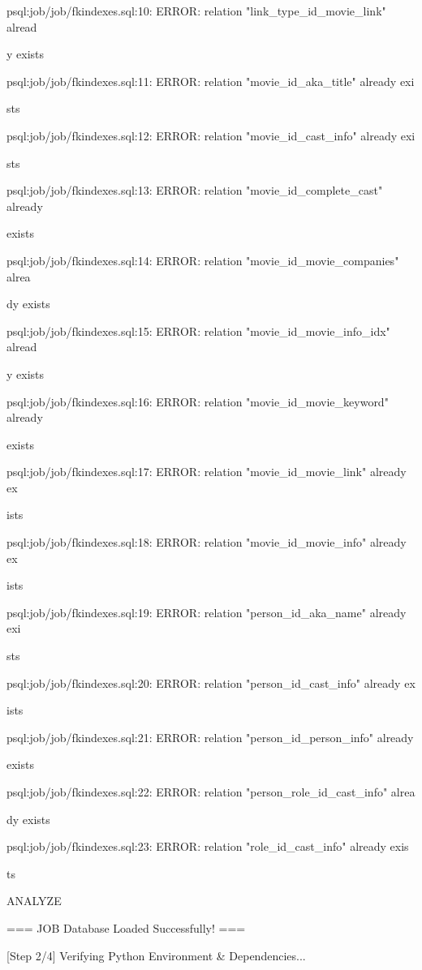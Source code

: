\documentclass[11pt,a4paper]{article}
\begin{document}
psql:job/job/fkindexes.sql:10: ERROR:  relation "link\_type\_id\_movie\_link" alread

y exists

psql:job/job/fkindexes.sql:11: ERROR:  relation "movie\_id\_aka\_title" already exi

sts

psql:job/job/fkindexes.sql:12: ERROR:  relation "movie\_id\_cast\_info" already exi

sts

psql:job/job/fkindexes.sql:13: ERROR:  relation "movie\_id\_complete\_cast" already

exists

psql:job/job/fkindexes.sql:14: ERROR:  relation "movie\_id\_movie\_companies" alrea

dy exists

psql:job/job/fkindexes.sql:15: ERROR:  relation "movie\_id\_movie\_info\_idx" alread

y exists

psql:job/job/fkindexes.sql:16: ERROR:  relation "movie\_id\_movie\_keyword" already

exists

psql:job/job/fkindexes.sql:17: ERROR:  relation "movie\_id\_movie\_link" already ex

ists

psql:job/job/fkindexes.sql:18: ERROR:  relation "movie\_id\_movie\_info" already ex

ists

psql:job/job/fkindexes.sql:19: ERROR:  relation "person\_id\_aka\_name" already exi

sts

psql:job/job/fkindexes.sql:20: ERROR:  relation "person\_id\_cast\_info" already ex

ists

psql:job/job/fkindexes.sql:21: ERROR:  relation "person\_id\_person\_info" already

exists

psql:job/job/fkindexes.sql:22: ERROR:  relation "person\_role\_id\_cast\_info" alrea

dy exists

psql:job/job/fkindexes.sql:23: ERROR:  relation "role\_id\_cast\_info" already exis

ts

ANALYZE

=== JOB Database Loaded Successfully! ===

[Step 2/4] Verifying Python Environment \& Dependencies...
\end{document}
